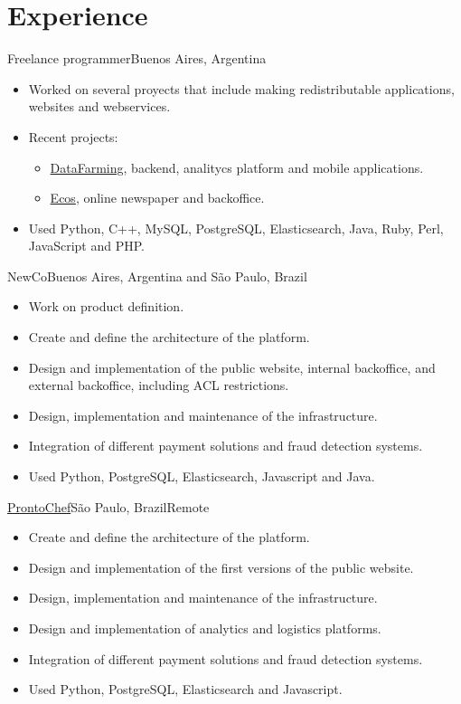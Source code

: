 \documentclass[a4paper,11pt]{moderncv}
\newcommand\weblink[2] {{\color{href} \href{#1}{#2}}}
\begin{document}
\pagebreak

\section{Experience}
{Freelance programmer}{Buenos Aires, Argentina}{}{%
\begin{itemize}
  \item Worked on several proyects that include making redistributable
  applications, websites and webservices.
  \item Recent projects:
  \begin{itemize}
    \item \weblink{http://www.datafarming.net}{DataFarming}, backend,
      analitycs platform and mobile applications.
    \item \weblink{http://www.ecos.la}{Ecos}, online newspaper and
      backoffice.
  \end{itemize}
  \item Used Python, C++, MySQL, PostgreSQL, Elasticsearch, Java, Ruby,
    Perl, JavaScript and PHP.
\end{itemize}
}
%
{NewCo}{Buenos Aires, Argentina and São Paulo, Brazil}{}{%
\begin{itemize}
  \item Work on product definition.
  \item Create and define the architecture of the platform.
  \item Design and implementation of the public website, internal backoffice, and external backoffice, including ACL restrictions.
  \item Design, implementation and maintenance of the infrastructure.
  \item Integration of different payment solutions and fraud detection 
    systems.
  \item Used Python, PostgreSQL, Elasticsearch, Javascript and Java.
\end{itemize}
}
%
{\weblink{http://www.prontochef.com.br}{ProntoChef}}{São Paulo, Brazil}{Remote}{%
\begin{itemize}
  \item Create and define the architecture of the platform.
  \item Design and implementation of the first versions of the public website.
  \item Design, implementation and maintenance of the infrastructure.
  \item Design and implementation of analytics and logistics platforms.
  \item Integration of different payment solutions and fraud detection 
    systems.
  \item Used Python, PostgreSQL, Elasticsearch and Javascript.
\end{itemize}
}
\end{document}
